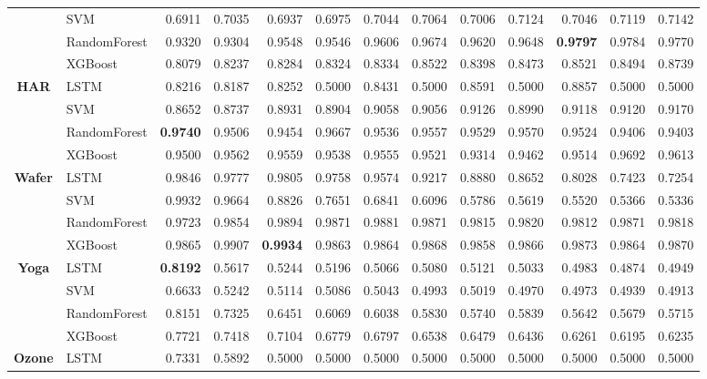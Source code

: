 \begin{table}[h]
\begin{adjustbox}{max width=15cm}
\begin{tabular}{|c|l|r|r|r|r|r|r|r|r|r|r|r|}
		& SVM &  0.6911 &  0.7035 &  0.6937 &  0.6975 &  0.7044 &  0.7064 &  0.7006 &  0.7124 &  0.7046 &  0.7119 &  0.7142 \\
		& RandomForest &  0.9320 &  0.9304 &  0.9548 &  0.9546 &  0.9606 &  0.9674 &  0.9620 &  0.9648 &  \textbf{0.9797} &  0.9784 &  0.9770 \\
		& XGBoost &  0.8079 &  0.8237 &  0.8284 &  0.8324 &  0.8334 &  0.8522 &  0.8398 &  0.8473 &  0.8521 &  0.8494 &  0.8739 \\
		\hline
		\textbf{HAR} & LSTM &  0.8216 &  0.8187 &  0.8252 &  0.5000 &  0.8431 &  0.5000 &  0.8591 &  0.5000 &  0.8857 &  0.5000 &  0.5000 \\
		& SVM &  0.8652 &  0.8737 &  0.8931 &  0.8904 &  0.9058 &  0.9056 &  0.9126 &  0.8990 &  0.9118 &  0.9120 &  0.9170 \\
		& RandomForest &  \textbf{0.9740} &  0.9506 &  0.9454 &  0.9667 &  0.9536 &  0.9557 &  0.9529 &  0.9570 &  0.9524 &  0.9406 &  0.9403 \\
		& XGBoost &  0.9500 &  0.9562 &  0.9559 &  0.9538 &  0.9555 &  0.9521 &  0.9314 &  0.9462 &  0.9514 &  0.9692 &  0.9613 \\
		\hline
		\textbf{Wafer} & LSTM &  0.9846 &  0.9777 &  0.9805 &  0.9758 &  0.9574 &  0.9217 &  0.8880 &  0.8652 &  0.8028 &  0.7423 &  0.7254 \\
		& SVM &  0.9932 &  0.9664 &  0.8826 &  0.7651 &  0.6841 &  0.6096 &  0.5786 &  0.5619 &  0.5520 &  0.5366 &  0.5336 \\
		& RandomForest &  0.9723 &  0.9854 &  0.9894 &  0.9871 &  0.9881 &  0.9871 &  0.9815 &  0.9820 &  0.9812 &  0.9871 &  0.9818 \\
		& XGBoost &  0.9865 &  0.9907 &  \textbf{0.9934} &  0.9863 &  0.9864 &  0.9868 &  0.9858 &  0.9866 &  0.9873 &  0.9864 &  0.9870 \\
		\hline
		\textbf{Yoga} & LSTM &  \textbf{0.8192} &  0.5617 &  0.5244 &  0.5196 &  0.5066 &  0.5080 &  0.5121 &  0.5033 &  0.4983 &  0.4874 &  0.4949 \\
		& SVM &  0.6633 &  0.5242 &  0.5114 &  0.5086 &  0.5043 &  0.4993 &  0.5019 &  0.4970 &  0.4973 &  0.4939 &  0.4913 \\
		& RandomForest &  0.8151 &  0.7325 &  0.6451 &  0.6069 &  0.6038 &  0.5830 &  0.5740 &  0.5839 &  0.5642 &  0.5679 &  0.5715 \\
		& XGBoost &  0.7721 &  0.7418 &  0.7104 &  0.6779 &  0.6797 &  0.6538 &  0.6479 &  0.6436 &  0.6261 &  0.6195 &  0.6235 \\
		\hline
		\textbf{Ozone} & LSTM &  0.7331 &  0.5892 &  0.5000 &  0.5000 &  0.5000 &  0.5000 &  0.5000 &  0.5000 &  0.5000 &  0.5000 &  0.5000 \\

\end{tabular}
\end{adjustbox}
\end{table}
